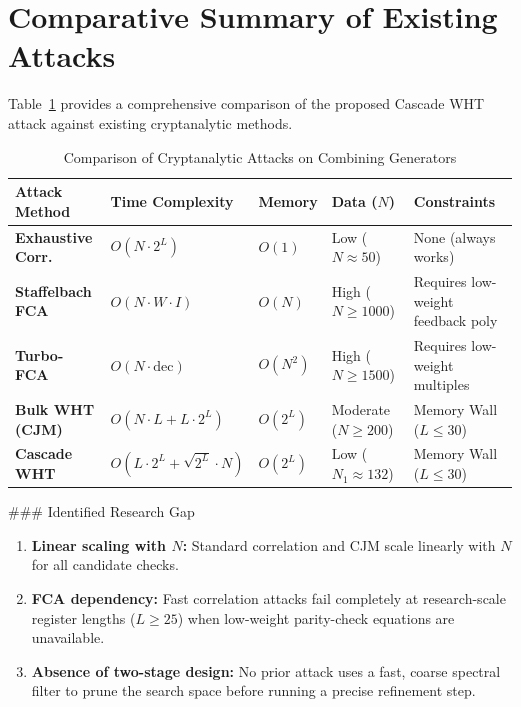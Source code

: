 \section{Comparative Summary of Existing Attacks}
\label{sec:literature_summary}

Table~\ref{tab:cryptanalysis_comparison} provides a comprehensive comparison of the proposed Cascade WHT attack against existing cryptanalytic methods.

\begin{table}[h]
\centering
\caption{Comparison of Cryptanalytic Attacks on Combining Generators}
\label{tab:cryptanalysis_comparison}
\begin{tabular}{@{}lllll@{}}
\toprule
\textbf{Attack Method} & \textbf{Time Complexity} & \textbf{Memory} & \textbf{Data ($N$)} & \textbf{Constraints} \\ \midrule
\textbf{Exhaustive Corr.} & $O(N \cdot 2^L)$ & $O(1)$ & Low ($N \approx 50$) & None (always works) \\
\textbf{Staffelbach FCA} & $O(N \cdot W \cdot I)$ & $O(N)$ & High ($N \ge 1000$) & Requires low-weight feedback poly \\
\textbf{Turbo-FCA} & $O(N \cdot \text{dec})$ & $O(N^2)$ & High ($N \ge 1500$) & Requires low-weight multiples \\
\textbf{Bulk WHT (CJM)} & $O(N \cdot L + L \cdot 2^L)$ & $O(2^L)$ & Moderate ($N \ge 200$) & Memory Wall ($L \le 30$) \\
\textbf{Cascade WHT} & $O(L \cdot 2^L + \sqrt{2^L} \cdot N)$ & $O(2^L)$ & Low ($N_1 \approx 132$) & Memory Wall ($L \le 30$) \\ \bottomrule
\end{tabular}
\end{table}

### Identified Research Gap
\begin{enumerate}
    \item \textbf{Linear scaling with $N$:} Standard correlation and CJM scale linearly with $N$ for all candidate checks.
    \item \textbf{FCA dependency:} Fast correlation attacks fail completely at research-scale register lengths ($L \ge 25$) when low-weight parity-check equations are unavailable.
    \item \textbf{Absence of two-stage design:} No prior attack uses a fast, coarse spectral filter to prune the search space before running a precise refinement step.
\end{enumerate}

